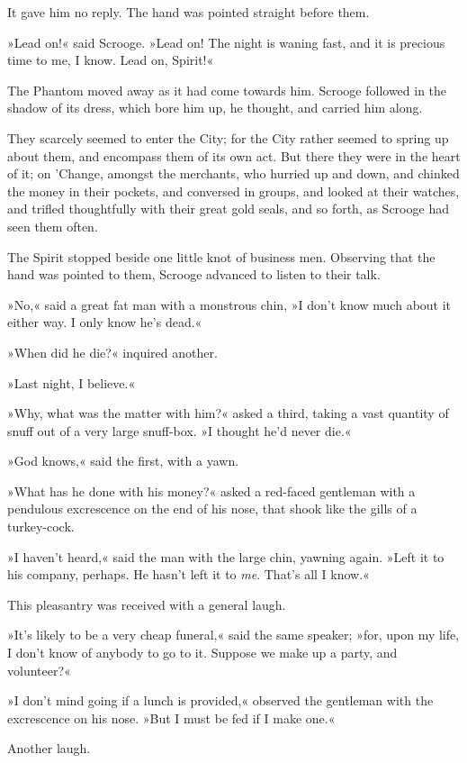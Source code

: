 It gave him no reply. The hand was pointed straight before them.

»Lead on!« said Scrooge. »Lead on! The night is waning fast, and it is precious time to me, I know. Lead on, Spirit!«

The Phantom moved away as it had come towards him. Scrooge followed in the shadow of its dress, which bore him up, he thought, and carried him along.

They scarcely seemed to enter the City; for the City rather seemed to spring up about them, and encompass them of its own act. But there they were in the heart of it; on 'Change, amongst the merchants, who hurried up and down, and chinked the money in their pockets, and conversed in groups, and looked at their watches, and trifled thoughtfully with their great gold seals, and so forth, as Scrooge had seen them often.

The Spirit stopped beside one little knot of business men. Observing that the hand was pointed to them, Scrooge advanced to listen to their talk.

»No,« said a great fat man with a monstrous chin, »I don't know much about it either way. I only know he's dead.«

»When did he die?« inquired another.

»Last night, I believe.«

»Why, what was the matter with him?« asked a third, taking a vast quantity of snuff out of a very large snuff-box. »I thought he'd never die.«

»God knows,« said the first, with a yawn.

»What has he done with his money?« asked a red-faced gentleman with a pendulous excrescence on the end of his nose, that shook like the gills of a turkey-cock.

»I haven't heard,« said the man with the large chin, yawning again. »Left it to his company, perhaps. He hasn't left it to \textit{me}. That's all I know.«

This pleasantry was received with a general laugh.

»It's likely to be a very cheap funeral,« said the same speaker; »for, upon my life, I don't know of anybody to go to it. Suppose we make up a party, and volunteer?«

»I don't mind going if a lunch is provided,« observed the gentleman with the excrescence on his nose. »But I must be fed if I make one.«

Another laugh.

